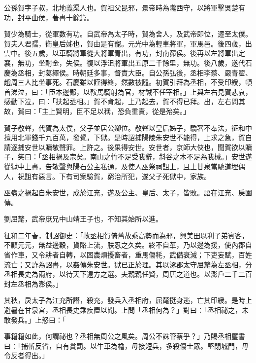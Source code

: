 
\begin{pinyinscope}
公孫賀字子叔，北地義渠人也。賀祖父昆邪，景帝時為隴西守，以將軍擊吳楚有功，封平曲侯，著書十餘篇。

賀少為騎士，從軍數有功。自武帝為太子時，賀為舍人，及武帝即位，遷至太僕。賀夫人君孺，衛皇后姊也，賀由是有寵。元光中為輕車將軍，軍馬邑。後四歲，出雲中。後五歲，以車騎將軍從大將軍青出，有功，封南窌侯。後再以左將軍出定襄，無功，坐酎金，失侯。復以浮沮將軍出五原二千餘里，無功。後八歲，遂代石慶為丞相，封葛繹侯。時朝廷多事，督責大臣。自公孫弘後，丞相李蔡、嚴青翟、趙周三人比坐事死。石慶雖以謹得終，然數被譴。初賀引拜為丞相，不受印綬，頓首涕泣，曰：「臣本邊鄙，以鞍馬騎射為官，材誠不任宰相。」上與左右見賀悲哀，感動下泣，曰：「扶起丞相。」賀不肯起，上乃起去，賀不得已拜。出，左右問其故，賀曰：「主上賢明，臣不足以稱，恐負重責，從是殆矣。」

賀子敬聲，代賀為太僕，父子並居公卿位。敬聲以皇后姊子，驕奢不奉法，征和中擅用北軍錢千九百萬，發覺，下獄。是時詔捕陽陵朱安世不能得，上求之急，賀自請逐捕安世以贖敬聲罪。上許之。後果得安世。安世者，京師大俠也，聞賀欲以贖子，笑曰：「丞相禍及宗矣。南山之竹不足受我辭，斜谷之木不足為我械。」安世遂從獄中上書，告敬聲與陽石公主私通，及使人巫祭祠詛上，且上甘泉當馳道埋偶人，祝詛有惡言。下有司案驗賀，窮治所犯，遂父子死獄中，家族。

巫蠱之禍起自朱安世，成於江充，遂及公主、皇后、太子，皆敗。語在江充、戾園傳。

劉屈氂，武帝庶兄中山靖王子也，不知其始所以進。

征和二年春，制詔御史：「故丞相賀倚舊故乘高勢而為邪，興美田以利子弟賓客，不顧元元，無益邊穀，貨賂上流，朕忍之久矣。終不自革，乃以邊為援，使內郡自省作車，又令耕者自轉，以困農煩擾畜者，重馬傷秏，武備衰減；下吏妄賦，百姓流亡；又詐為詔書，以姦傳朱安世。獄已正於理。其以涿郡太守屈氂為左丞相，分丞相長史為兩府，以待天下遠方之選。夫親親任賢，周唐之道也。以澎戶二千二百封左丞相為澎侯。」

其秋，戾太子為江充所譖，殺充，發兵入丞相府，屈氂挺身逃，亡其印綬。是時上避暑在甘泉宮，丞相長史乘疾置以聞。上問「丞相何為？」對曰：「丞相祕之，未敢發兵。」上怒曰：「

事籍籍如此，何謂祕也？丞相無周公之風矣。周公不誅管蔡乎？」乃賜丞相璽書曰：「捕斬反省，自有賞罰。以牛車為櫓，毋接短兵，多殺傷士眾。堅閉城門，毋令反者得出。」


\end{pinyinscope}
